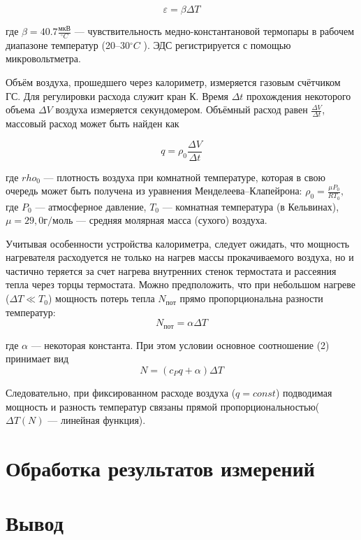\documentclass[12pt,a4paper]{article}
\begin{document}
		\begin{equation}
		    \varepsilon =\beta \Delta T
		\end{equation}
		
		 где $\beta = 40.7 \frac{мкВ}{^\circ C}$ — чувствительность медно-константановой термопары в рабочем диапазоне температур (20–30$^\circ C$ ). ЭДС регистрируется с помощью микровольтметра.
		
		Объём воздуха, прошедшего через калориметр, измеряется газовым счётчиком ГС. Для регулировки расхода служит кран К. Время $\Delta t$ прохождения
		некоторого объема $\Delta V$ воздуха измеряется секундомером. Объёмный расход равен $\frac{\Delta V}{\Delta t} $, массовый расход может быть найден как 
		
		\begin{equation}
		    q = \rho_{0} \frac{\Delta V}{\Delta t}
		\end{equation}
		
	 где $rho_{0}$ — плотность воздуха при комнатной температуре, которая в свою очередь может быть получена из уравнения Менделеева–Клапейрона: $\rho_{0}= \frac{\mu P_{0} }{R T_{0}},$ где $P_{0}$ — атмосферное давление, $T_{0}$ — комнатная температура (в Кельвинах), $\mu = 29,0 {г/моль}$ — средняя молярная масса (сухого) воздуха.
		
		Учитывая особенности устройства калориметра, следует ожидать, что мощность нагревателя расходуется не только на нагрев массы прокачиваемого воздуха, но и частично теряется за счет нагрева внутренних стенок термостата и рассеяния тепла через торцы термостата. Можно предположить, что при небольшом нагреве ($\Delta T \ll T_{0}$) мощность потерь тепла $N_{пот}$ прямо пропорциональна разности температур:
		\begin{equation}
		    N_{пот} = \alpha \Delta T
		\end{equation}
		
		 где $\alpha$ — некоторая константа. При этом условии основное соотношение (2) принимает вид 
		 \begin{equation}
		    N = (c_{P}q +\alpha)\Delta T
		\end{equation}
		 
		Следовательно, при фиксированном расходе воздуха ($q = const$) подводимая мощность и разность температур связаны прямой пропорциональностью($\Delta T(N)$ — линейная функция).
 
\section{Обработка результатов измерений}


\section{Вывод}
\end{document}
